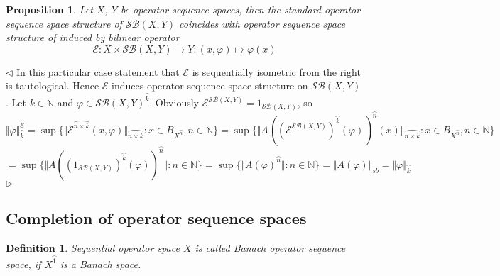 \documentclass[12pt]{article}
\newtheorem{proposition}[theorem]{Proposition}
\newtheorem{definition}[theorem]{Definition}
\newenvironment{proof}{\par $\triangleleft$}{$\triangleright$}
\begin{document}
\begin{proposition}\label{PrSQOpSqQuanIsEquivToStandard}
Let $X$, $Y$ be operator sequence spaces, then the standard operator sequence space structure of $\mathcal{SB}(X,Y)$ coincides with operator sequence space structure of induced by bilinear operator
$$
\mathcal{E}:X\times\mathcal{SB}(X,Y)\to Y:(x,\varphi)\mapsto\varphi(x)
$$
\end{proposition}
\begin{proof}
In this particular case statement that $\mathcal{E}$ is sequentially isometric from the right is tautological. Hence $\mathcal{E}$ induces operator sequence space structure on $\mathcal{SB}(X,Y)$. Let $k\in\mathbb{N}$ and $\varphi\in\mathcal{SB}(X,Y)^{\wideparen{k}}$. 
Obviously $\mathcal{\mathcal{E}}^{\mathcal{SB}(X,Y)}=1_{\mathcal{SB}(X,Y)}$, so
$$
\Vert\varphi\Vert_{\wideparen{k}}^{\mathcal{E}}
=\sup\{\Vert\mathcal{E}^{\wideparen{n\times k}}(x,\varphi)\Vert_{\wideparen{n\times k}}:x\in B_{X^{\wideparen{n}}}, n\in\mathbb{N}\}
=\sup\{\Vert A((\mathcal{E}^{\mathcal{SB}(X,Y)})^{\wideparen{k}}(\varphi))^{\wideparen{n}}(x)\Vert_{\wideparen{n\times k}}:x\in B_{X^{\wideparen{n}}}, n\in\mathbb{N}\}
$$
$$
=\sup\{\Vert A((1_{\mathcal{SB}(X,Y)})^{\wideparen{k}}(\varphi))^{\wideparen{n}}\Vert: n\in\mathbb{N}\}
=\sup\{\Vert A(\varphi)^{\wideparen{n}}\Vert: n\in\mathbb{N}\}
=\Vert A(\varphi)\Vert_{sb}=\Vert\varphi\Vert_{\wideparen{k}}
$$
\end{proof}

























\subsection{Completion of operator sequence spaces}

\begin{definition}\label{DefSQBanSpace}
Sequential operator space $X$ is called \textit{Banach operator sequence space}, if $X^{\wideparen{1}}$ is a Banach space.
\end{definition}
\end{document}
